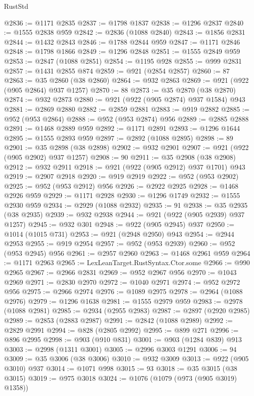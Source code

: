 \begin{lexlean}{RustStd}
\begin{coremodule}
@2836 := @1171 @2835
@2837 := @1798 @1837
@2838 := @1296 @2837
@2840 := @1555 @2838 @959
@2842 := @2836 (@1088 @2840)
@2843 := @1856 @2831
@2844 := @1432 @2843
@2846 := @1788 @2844 @959
@2847 := @1171 @2846
@2848 := @1798 @1866
@2849 := @1296 @2848
@2851 := @1555 @2849 @959
@2853 := @2847 (@1088 @2851)
@2854 := @1195 @928
@2855 := @999 @2831
@2857 := @1431 @2855 @874
@2859 := @921 (@2854 @2857)
@2860 := 87
@2863 := @35 @2860 (@38 @2860)
@2864 := @932 @2863
@2869 := @921 (@922 (@905 @2864) @937 @1257)
@2870 := 88
@2873 := @35 @2870 (@38 @2870)
@2874 := @932 @2873
@2880 := @921 (@922 (@905 @2874) @937 @1584) @943
@2881 := @2869 @2880
@2882 := @2859 @2881
@2883 := @919 @2882
@2885 := @952 (@953 @2864)
@2888 := @952 (@953 @2874) @956
@2889 := @2885 @2888
@2891 := @1468 @2889 @959
@2892 := @1171 @2891
@2893 := @1296 @1644
@2895 := @1555 @2893 @959
@2897 := @2892 (@1088 @2895)
@2898 := 89
@2901 := @35 @2898 (@38 @2898)
@2902 := @932 @2901
@2907 := @921 (@922 (@905 @2902) @937 @1257)
@2908 := 90
@2911 := @35 @2908 (@38 @2908)
@2912 := @932 @2911
@2918 := @921 (@922 (@905 @2912) @937 @1701) @943
@2919 := @2907 @2918
@2920 := @919 @2919
@2922 := @952 (@953 @2902)
@2925 := @952 (@953 @2912) @956
@2926 := @2922 @2925
@2928 := @1468 @2926 @959
@2929 := @1171 @2928
@2930 := @1296 @1749
@2932 := @1555 @2930 @959
@2934 := @2929 (@1088 @2932)
@2935 := 91
@2938 := @35 @2935 (@38 @2935)
@2939 := @932 @2938
@2944 := @921 (@922 (@905 @2939) @937 @1257)
@2945 := @932 @301
@2948 := @922 (@905 @2945) @937
@2950 := @1014 (@1015 @731)
@2953 := @921 (@2948 @2950) @943
@2954 := @2944 @2953
@2955 := @919 @2954
@2957 := @952 (@953 @2939)
@2960 := @952 (@953 @2945) @956
@2961 := @2957 @2960
@2963 := @1468 @2961 @959
@2964 := @1171 @2963
@2965 := LexLeanTarget.RustSyntax.Ctor.some
@2966 := @990 @2965
@2967 := @2966 @2831
@2969 := @952 @2967 @956
@2970 := @1043 @2969
@2971 := @2830 @2970
@2972 := @1040 @2971
@2974 := @952 @2972 @956
@2975 := @2966 @2974
@2976 := @1089 @2975
@2978 := @2964 (@1088 @2976)
@2979 := @1296 @1638
@2981 := @1555 @2979 @959
@2983 := @2978 (@1088 @2981)
@2985 := @2934 (@2955 @2983)
@2987 := @2897 (@2920 @2985)
@2989 := @2853 (@2883 @2987)
@2991 := @2842 (@1088 @2989)
@2992 := @2829 @2991
@2994 := @828 (@2805 @2992)
@2995 := @899 @271
@2996 := @896 @2995
@2998 := @903 (@910 @831)
@3001 := @903 (@1284 @839) @913
@3003 := @2998 (@1311 @3001)
@3005 := @2996 @3003 @1291
@3006 := 94
@3009 := @35 @3006 (@38 @3006)
@3010 := @932 @3009
@3013 := @922 (@905 @3010) @937
@3014 := @1071 @998
@3015 := 93
@3018 := @35 @3015 (@38 @3015)
@3019 := @975 @3018
@3024 := @1076 (@1079 (@973 (@905 @3019) @1358))

\end{coremodule}
\end{lexlean}
